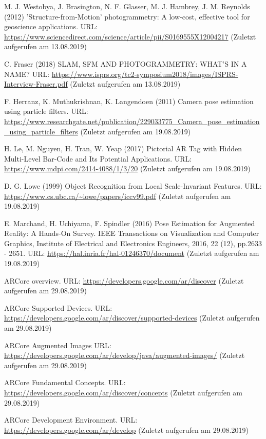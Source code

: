 \documentclass[12pt,oneside]{scrreprt}
\begin{document}
\begin{thebibliography}{10}
 M. J. Westobya, J. Brasington, N. F. Glasser, M. J. Hambrey, J. M. Reynolds (2012) 'Structure-from-Motion' photogrammetry: A low-cost, effective tool for geoscience applications. URL: \url{https://www.sciencedirect.com/science/article/pii/S0169555X12004217} (Zuletzt aufgerufen am 13.08.2019)

 C. Fraser (2018) SLAM, SFM AND PHOTOGRAMMETRY: WHAT’S IN A NAME? URL: \url{https://www.isprs.org/tc2-symposium2018/images/ISPRS-Interview-Fraser.pdf} (Zuletzt aufgerufen am 13.08.2019)

 F. Herranz, K. Muthukrishnan, K. Langendoen (2011) Camera pose estimation using particle filters. URL: \url{https://www.researchgate.net/publication/229033775_Camera_pose_estimation_using_particle_filters} (Zuletzt aufgerufen am 19.08.2019)

 H. Le, M. Nguyen, H. Tran, W. Yeap (2017) Pictorial AR Tag with Hidden Multi-Level Bar-Code and Its Potential Applications. URL: \url{https://www.mdpi.com/2414-4088/1/3/20} (Zuletzt aufgerufen am 19.08.2019)

 D. G. Lowe (1999) Object Recognition from Local Scale-Invariant Features. URL: \url{https://www.cs.ubc.ca/~lowe/papers/iccv99.pdf} (Zuletzt aufgerufen am 19.08.2019)

 E. Marchand, H. Uchiyama, F. Spindler (2016) Pose Estimation for Augmented Reality: A Hands-On Survey. IEEE Transactions on Visualization and Computer Graphics, Institute of Electrical and Electronics Engineers, 2016, 22 (12), pp.2633 - 2651. URL: \url{https://hal.inria.fr/hal-01246370/document} (Zuletzt aufgerufen am 19.08.2019)

 ARCore overview. URL: \url{https://developers.google.com/ar/discover} (Zuletzt aufgerufen am 29.08.2019)

 ARCore Supported Devices. URL: \url{https://developers.google.com/ar/discover/supported-devices} (Zuletzt aufgerufen am 29.08.2019)

 ARCore Augmented Images URL: \url{https://developers.google.com/ar/develop/java/augmented-images/} (Zuletzt aufgerufen am 29.08.2019)

 ARCore Fundamental Concepts. URL: \url{https://developers.google.com/ar/discover/concepts} (Zuletzt aufgerufen am 29.08.2019)

 ARCore Development Environment. URL: \url{https://developers.google.com/ar/develop} (Zuletzt aufgerufen am 29.08.2019)


\end{thebibliography}
\end{document}
